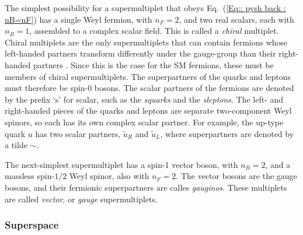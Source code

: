 \documentclass[twoside,english]{uiofysmaster}
\begin{document}
The simplest possibility for a supermultiplet that obeys Eq.~(\ref{Eq:: pysh back : nB=nF}) has a single Weyl fermion, with $n_F =2$, and two real scalars, each with $n_B=1$, assembled to a complex scalar field. This is called a \textit{chiral} multiplet. Chiral multiplets are the only supermultiplets that can contain fermions whose left-handed partners transform differently under the gauge-group than their right-handed partners \cite{martin2010supersymmetry}. Since this is the case for the SM fermions, these must be members of chiral supermultiplets. The superpartners of the quarks and leptons must therefore be spin-0 bosons. The scalar partners of the fermions are denoted by the prefix `s' for scalar, such as the \textit{squarks} and the \textit{sleptons}. The left- and right-handed pieces of the quarks and leptons are separate two-component Weyl spinors, so each has its own complex scalar partner. For example, the up-type quark $u$ has two scalar partners, $\widetilde{u}_R$ and $\widetilde{u}_L$, where superpartners are denoted by a tilde $\sim$. 

The next-simplest supermultiplet has a spin-1 vector boson, with $n_B=2$, and a massless spin-$1/2$ Weyl spinor, also with $n_F=2$. The vector bosons are the gauge bosons, and their fermionic superpartners are calles \textit{gauginos}. These multiplets are called \textit{vector}, or \textit{gauge} supermultiplets. 




\subsubsection{Superspace}
\end{document}
